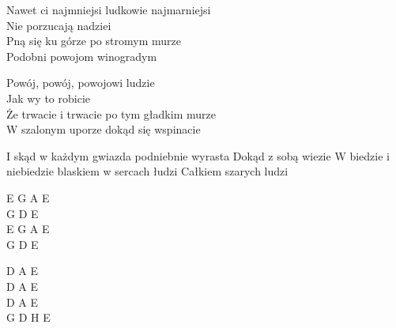 \begin{text}
    Nawet ci najmniejsi ludkowie najmarniejsi\\
    Nie porzucają nadziei\\
    Pną się ku górze po stromym murze\\
    Podobni powojom winogradym

    \vin Powój, powój, powojowi ludzie\\
    \vin Jak wy to robicie\\
    \vin Że trwacie i trwacie po tym gładkim murze\\
    \vin W szalonym uporze dokąd się wspinacie

    I skąd w każdym gwiazda podniebnie wyrasta
    Dokąd z sobą wiezie
    W biedzie i niebiedzie blaskiem w sercach łudzi
    Całkiem szarych ludzi
\end{text}
\begin{chord}
    E G A E\\
    G D E\\
    E G A E\\
    G D E

    D A E\\
    D A E\\
    D A E\\
    G D H E
\end{chord}